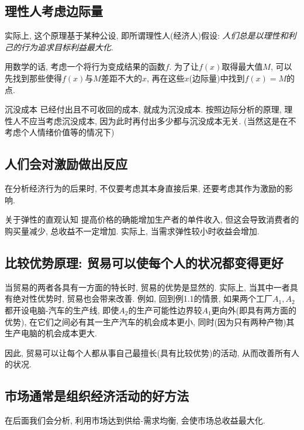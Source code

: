 \subsection*{理性人考虑边际量}

实际上, 这个原理基于某种公设, 即所谓理性人(经济人)假设: \textit{人们总是以理性和利己的行为追求目标利益最大化}. 

用数学的话, 考虑一个将行为变成结果的函数$f$. 为了让$f(x)$取得最大值$M$, 可以先找到那些使得$f(x)$与$M$差距不大的$x$, 再在这些$x$(边际量)中找到$f(x)=M$的点. 

\begin{example}{沉没成本}
	已经付出且不可收回的成本, 就成为沉没成本. 按照边际分析的原理, 理性人不应当考虑沉没成本, 因为此时再付出多少都与沉没成本无关. (当然这是在不考虑个人情绪价值等的情况下)
\end{example}

\subsection*{人们会对激励做出反应}

在分析经济行为的后果时, 不仅要考虑其本身直接后果, 还要考虑其作为激励的影响. 

\begin{example}{关于弹性的直观认知}
	提高价格的确能增加生产者的单件收入, 但这会导致消费者的购买量减少, 总收益不一定增加. 实际上, 当需求弹性较小时收益会增加. 
\end{example}

\subsection*{比较优势原理: 贸易可以使每个人的状况都变得更好}

当贸易的两者各具有一方面的特长时, 贸易的优势是显然的. 实际上, 当其中一者具有绝对性优势时, 贸易也会带来改善. 例如, 回到例1.1的情景, 如果两个工厂$A_1,A_2$都开设电脑-汽车的生产线, 即使$A_2$的生产可能性边界较$A_1$更向外(即具有两方面的优势), 在它们之间必有其一生产汽车的机会成本更小, 同时(因为只有两种产物)其生产电脑的机会成本更大. 

因此, 贸易可以让每个人都从事自己最擅长(具有比较优势)的活动, 从而改善所有人的状况. 

\subsection*{市场通常是组织经济活动的好方法}

在后面我们会分析, 利用市场达到供给-需求均衡, 会使市场总收益最大化. 

